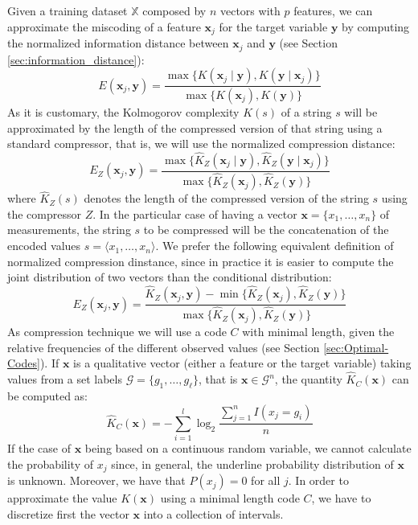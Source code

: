 Given a training dataset $\mathbb{X}$ composed by $n$ vectors with $p$ features, we can approximate the miscoding of a feature $\mathbf{x}_j$ for the target variable $\mathbf{y}$ by computing the normalized information distance between $\mathbf{x}_j$ and $\mathbf{y}$ (see Section \ref{sec:information_distance}):
\[
E(\mathbf{x}_j, \mathbf{y}) = \frac{\max\{ K(\mathbf{x}_j \mid \mathbf{y}), K(\mathbf{y} \mid \mathbf{x}_j) \}}{\max \{ K(\mathbf{x}_j), K(\mathbf{y}) \} }
\]
As it is customary, the Kolmogorov complexity $K(s)$ of a string $s$ will be approximated by the length of the compressed version of that string using a standard compressor, that is, we will use the normalized compression distance:
\[
E_Z(\mathbf{x}_j, \mathbf{y}) = \frac{\max\{ \hat{K}_Z(\mathbf{x}_j \mid \mathbf{y}), \hat{K}_Z(\mathbf{y} \mid \mathbf{x}_j) \}}{\max \{ \hat{K}_Z(\mathbf{x}_j), \hat{K}_Z(\mathbf{y}) \} }
\]
where $\hat{K}_Z(s)$ denotes the length of the compressed version of the string $s$ using the compressor $Z$. In the particular case of having a vector $\mathbf{x} = \{ x_1, \ldots, x_n \}$ of measurements, the string $s$ to be compressed will be the concatenation of the encoded values $s = \langle x_1, \ldots, x_n \rangle$. We prefer the following equivalent definition of normalized compression dinstance, since in practice it is easier to compute the joint distribution of two vectors than the conditional distribution:
\[
E_Z(\mathbf{x}_j, \mathbf{y}) = \frac{ \hat{K}_Z(\mathbf{x}_j, \mathbf{y}) - \min\{ \hat{K}_Z(\mathbf{x}_j), \hat{K}_Z(\mathbf{y}) \} } { \max\{ \hat{K}_Z(\mathbf{x}_j), \hat{K}_Z(\mathbf{y}) \} }
\]
As compression technique we will use a code $C$ with minimal length, given the relative frequencies of the different observed values (see Section \ref{sec:Optimal-Codes}). If $\mathbf{x}$ is a qualitative vector (either a feature or the target variable) taking values from a set labels $\mathcal{G} = \{g_1, \ldots, g_\ell\}$, that is $\mathbf{x} \in \mathcal{G}^n$, the quantity $\hat{K}_C(\mathbf{x})$ can be computed as:
\[
\hat{K}_C(\mathbf{x}) = - \sum_{i=1}^l \log_2{ \frac{ \sum_{j=1}^n I(x_j = g_i)} {n} } 
\]
If the case of $\mathbf{x}$ being based on a continuous random variable, we cannot calculate the probability of $x_j$ since, in general, the underline probability distribution of $\mathbf{x}$ is unknown. Moreover, we have that $P(x_j)=0$ for all $j$. In order to approximate the value $K(\mathbf{x})$ using a minimal length code $C$, we have to discretize first the vector $\mathbf{x}$ into a collection of intervals.

